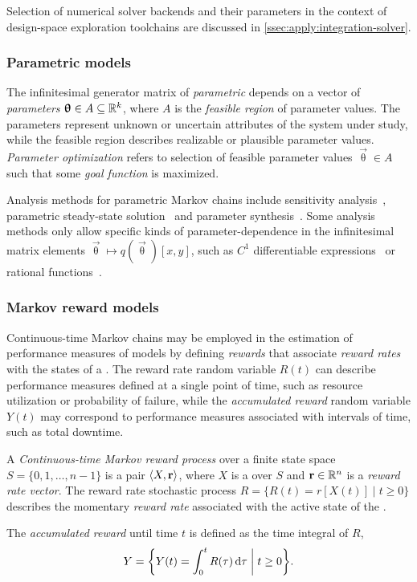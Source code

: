 Selection of numerical solver backends and their parameters in the context of design-space exploration toolchains are discussed in \vref{ssec:apply:integration-solver}.

\subsubsection{Parametric models}

The infinitesimal generator matrix of \emph{parametric } depends on a vector of \emph{parameters} \(\bm{\mathrm{\uptheta}} \in A \subseteq \mathbb{R}^k\), where \(A\) is the \emph{feasible region} of parameter values. The parameters represent unknown or uncertain attributes of the system under study, while the feasible region describes realizable or plausible parameter values. \emph{Parameter optimization} refers to selection of feasible parameter values \(\vec{\uptheta} \in A\) such that some \emph{goal function} is maximized.

Analysis methods for parametric Markov chains include sensitivity analysis~\citep{Blake88sensitivity}, parametric steady-state solution~\citep{Hahn11parametric,Voros17pdn} and parameter synthesis~\citep{Quatmann16mdp}. Some analysis methods only allow specific kinds of parameter-dependence in the infinitesimal matrix elements \(\vec{\uptheta} \mapsto q(\vec{\uptheta})[x, y]\), such as \(C^1\) differentiable expressions~\citep{Blake88sensitivity} or rational functions~\citep{Hahn11parametric}.

\subsubsection{Markov reward models}

Continuous-time Markov chains may be employed in the estimation of performance measures of models by defining \emph{rewards} that associate \emph{reward rates} with the states of a . The reward rate random variable $R(t)$ can describe performance measures defined at a single point of time, such as resource utilization or probability of failure, while the \emph{accumulated reward} random variable $Y(t)$ may correspond to performance measures associated with intervals of time, such as total downtime.

\begin{dfn}
  A \emph{Continuous-time Markov reward process} over a finite state space \(S = \{0, 1, \ldots, n - 1\}\) is a pair \(\langle X, \bm{\mathrm{r}} \rangle\), where \(X\) is a  over \(S\) and \(\bm{\mathrm{r}} \in \mathbb{R}^n\) is a \emph{reward rate vector}. The reward rate stochastic process \(R = \{ R(t) = r[X(t)] \mid t \ge 0 \}\) describes the momentary \emph{reward rate} associated with the active state of the .

  The \emph{accumulated reward} until time \(t\) is defined as the time integral of \(R\),
  \begin{equation}
    Y = \biggl\{ Y(t) = \int_{0}^t R(\tau) \,\mathrm{d} \tau \biggm\vert t \ge 0 \biggr\}\text.
  \end{equation}
\end{dfn}

